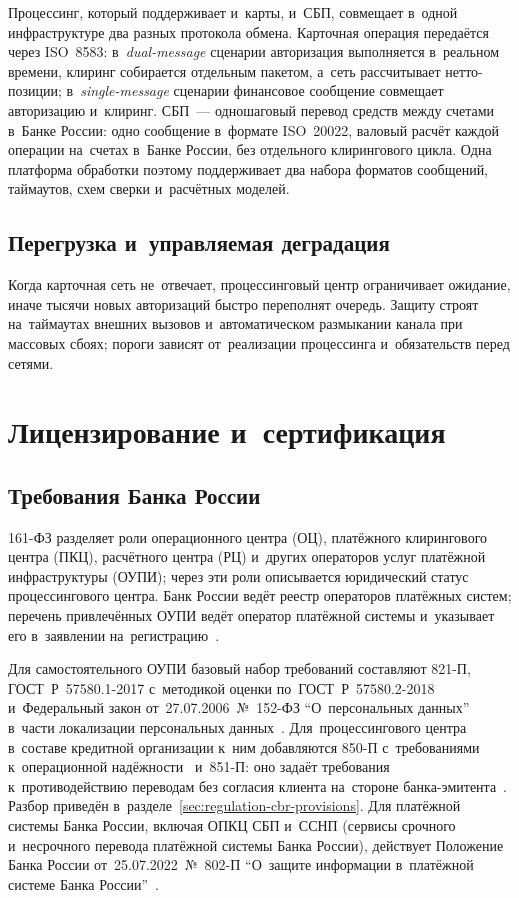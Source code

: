 Процессинг, который поддерживает и~карты, и~СБП, совмещает в~одной
инфраструктуре два разных протокола обмена. Карточная операция передаётся
через ISO~8583: в~\textit{dual-message} сценарии авторизация выполняется в~реальном
времени, клиринг собирается отдельным пакетом, а~сеть рассчитывает
нетто-позиции; в~\textit{single-message} сценарии финансовое сообщение совмещает
авторизацию и~клиринг. СБП~--- одношаговый перевод средств между счетами
в~Банке России: одно сообщение в~формате ISO~20022, валовый расчёт каждой
операции на~счетах в~Банке России, без отдельного клирингового цикла.
Одна платформа обработки
поэтому поддерживает два набора форматов сообщений, таймаутов, схем сверки
и~расчётных моделей.~\cite{cbr-sbp-actions,sbp-main}

\subsection*{Перегрузка и~управляемая деградация}

Когда карточная сеть не~отвечает, процессинговый центр ограничивает ожидание,
иначе тысячи новых авторизаций быстро переполнят очередь.
Защиту строят на~таймаутах внешних вызовов и~автоматическом размыкании канала
при массовых сбоях; пороги зависят от~реализации процессинга и~обязательств
перед сетями.

\section{Лицензирование и~сертификация}\label{sec:pc-licensing}

\subsection*{Требования Банка России}

161-ФЗ разделяет роли операционного центра (ОЦ), платёжного клирингового
центра (ПКЦ), расчётного центра (РЦ) и~других операторов услуг платёжной
инфраструктуры (ОУПИ); через эти роли описывается юридический статус
процессингового центра. Банк России ведёт реестр операторов платёжных систем;
перечень привлечённых ОУПИ ведёт оператор платёжной системы и~указывает его
в~заявлении на~регистрацию~\cite{fz-161,cbr-ps-glossary}.

Для самостоятельного ОУПИ базовый набор требований составляют 821-П,
ГОСТ~Р~57580.1-2017 с~методикой оценки по~ГОСТ~Р~57580.2-2018 и~Федеральный
закон от~27.07.2006~№~152-ФЗ \enquote{О~персональных данных} в~части локализации
персональных
данных~\cite{cbr-821p,gost-57580-1,gost-57580-2,fz-152}.
Для~процессингового центра в~составе кредитной организации к~ним добавляются
850-П с~требованиями к~операционной надёжности~\cite{cbr-850p} и~851-П: оно задаёт требования
к~противодействию переводам без согласия клиента на~стороне
банка-эмитента~\cite{cbr-851p}. Разбор приведён
в~разделе~\ref{sec:regulation-cbr-provisions}. Для платёжной системы Банка
России, включая ОПКЦ СБП и~ССНП (сервисы срочного и~несрочного перевода платёжной
системы Банка России), действует Положение Банка России от~25.07.2022~№~802-П
\enquote{О~защите информации в~платёжной системе Банка
России}~\cite{cbr-802p}.

